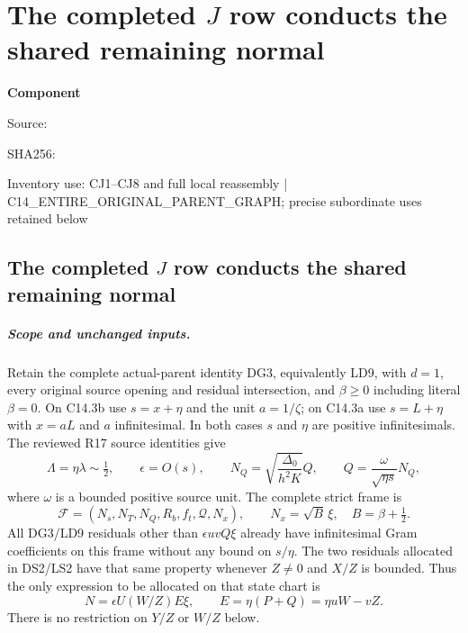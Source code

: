 \chapter{The completed $J$ row conducts the shared remaining normal}
\label{component:pe3bbfd3a8151}
\noindent\textbf{Component }\par
{\small\noindent Source: \par}
{\small\noindent SHA256: \par}
{\small\noindent Inventory use: CJ1--CJ8 and full local reassembly | C14\_\allowbreak{}ENTIRE\_\allowbreak{}ORIGINAL\_\allowbreak{}PARENT\_\allowbreak{}GRAPH; precise subordinate uses retained below\par}
\medskip
\section{The completed $J$ row conducts the shared remaining normal}
\label{pe3bbfd3a8151:sec:r18-completed-j}

\paragraph{Scope and unchanged inputs.}
Retain the complete actual-parent identity DG3, equivalently LD9,
with $d=1$, every original source opening and residual intersection,
and $\beta\ge0$ including literal $\beta=0$.  On C14.3b use
$s=x+\eta$ and the unit $a=1/\zeta$; on C14.3a use $s=L+\eta$
with $x=aL$ and $a$ infinitesimal.  In both cases $s$ and $\eta$
are positive infinitesimals.  The reviewed R17 source identities give
\[
 \Lambda=\eta\lambda\sim\tfrac12,\qquad
 \epsilon=O(s),\qquad
 N_Q=\sqrt{\frac{\Delta_0}{h^2K}}Q,
 \qquad
 Q=\frac{\omega}{\sqrt{\eta s}}N_Q,                 \tag{CJ1}
\]
where $\omega$ is a bounded positive source unit.  The complete strict
frame is
\[
 \mathcal F=(N_s,N_T,N_Q,R_b,f_t,\mathcal Q,N_x),
 \qquad N_x=\sqrt B\,\xi,\quad B=\beta+\tfrac12.
                                                               \tag{CJ2}
\]
All DG3/LD9 residuals other than $\epsilon uvQ\xi$ already have
infinitesimal Gram coefficients on this frame without any bound on
$s/\eta$.  The two residuals allocated in DS2/LS2 have that same
property whenever $Z\ne0$ and $X/Z$ is bounded.  Thus the only
expression to be allocated on that state chart is
\[
 N=\epsilon U(W/Z)E\xi,
 \qquad E=\eta(P+Q)=\eta uW-vZ.                    \tag{CJ3}
\]
There is no restriction on $Y/Z$ or $W/Z$ below.

